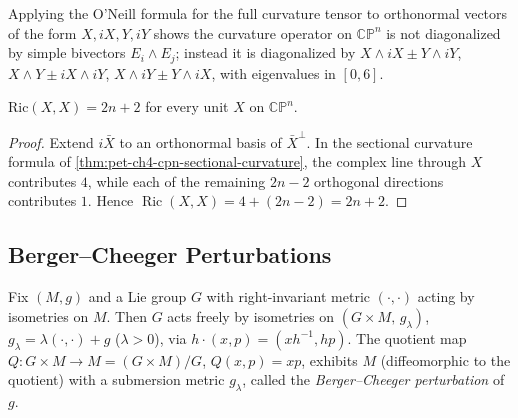 \begin{remark}
  \label{rem:pet-ch4-cpn-curvature-operator-eigenbasis}
  Applying the O'Neill formula for the full curvature tensor to orthonormal
  vectors of the form $X,iX,Y,iY$ shows the curvature operator on $\mathbb{CP}^n$
  is not diagonalized by simple bivectors $E_i\wedge E_j$; instead it is
  diagonalized by
  $X\wedge iX\pm Y\wedge iY$, $X\wedge Y\pm iX\wedge iY$, $X\wedge iY\pm Y\wedge iX$,
  with eigenvalues in $[0,6]$.
\end{remark}

\begin{proposition}
  \label{prop:pet-ch4-cpn-einstein}
  $\mathrm{Ric}(X,X)=2n+2$ for every unit $X$ on $\mathbb{CP}^n$.
\end{proposition}
\begin{proof}
  \sketch
  Extend $i\bar X$ to an orthonormal basis of $\bar X^\perp$. In the sectional
  curvature formula of \cref{thm:pet-ch4-cpn-sectional-curvature}, the complex
  line through $X$ contributes $4$, while each of the remaining $2n-2$
  orthogonal directions contributes $1$. Hence
  $\operatorname{Ric}(X,X)=4+(2n-2)=2n+2$.
\end{proof}

\subsection{Berger--Cheeger Perturbations}

\begin{definition}
  \label{def:pet-ch4-berger-cheeger-construction}
  Fix $(M,g)$ and a Lie group $G$ with right-invariant metric $(\cdot,\cdot)$
  acting by isometries on $M$. Then $G$ acts freely by isometries on
  $(G\times M,\,g_\lambda)$, $g_\lambda=\lambda(\cdot,\cdot)+g$ ($\lambda>0$), via
  $h\cdot(x,p)=(xh^{-1},hp)$. The quotient map $Q:G\times M\to M=(G\times M)/G$,
  $Q(x,p)=xp$, exhibits $M$ (diffeomorphic to the quotient) with a submersion
  metric $g_\lambda$, called the \emph{Berger--Cheeger perturbation} of $g$.
\end{definition}

